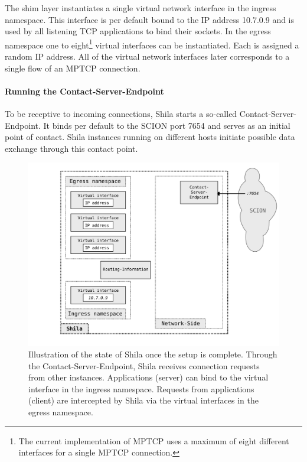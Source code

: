 The shim layer instantiates a single virtual network interface in the ingress namespace. This interface is per default bound to the IP address {\footnotesize 10.7.0.9} and is used by all listening TCP applications to bind their sockets. In the egress namespace one to eight\footnote{The current implementation of MPTCP uses a maximum of eight different interfaces for a single MPTCP connection.} virtual interfaces can be instantiated. Each is assigned a random IP address. All of the virtual network interfaces later corresponds to a single flow of an MPTCP connection.

\paragraph{Running the Contact-Server-Endpoint} To be receptive to incoming connections, Shila starts a so-called Contact-Server-Endpoint. It binds per default to the SCION port {\footnotesize 7654} and serves as an initial point of contact. Shila instances running on different hosts initiate possible data exchange through this contact point.

\begin{figure}
	\begin{center}
		\def\svgwidth{1\textwidth}
		\includegraphics[scale=0.2]{../illustrations/shilaIntroduction/StateAfterSetup.pdf}   
		\caption[]{Illustration of the state of Shila once the setup is complete. Through the Contact-Server-Endpoint, Shila receives connection requests from other instances. Applications (server) can bind to the virtual interface in the ingress namespace. Requests from applications (client) are intercepted by Shila via the virtual interfaces in the egress namespace.}
		\label{fig:ShilaIllustrationStateAfterSetup}
	\end{center}
\end{figure}


